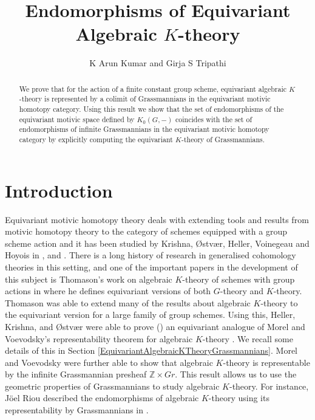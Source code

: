 \documentclass[11pt,twoside]{amsart}
\title{Endomorphisms of Equivariant Algebraic $K$-theory}
\author{K Arun Kumar and Girja S Tripathi}
\theoremstyle{definition}
\theoremstyle{remark}
\numberwithin{equation}{section}
\newcommand{\ZZ}{\mathbb{Z}}
\begin{document}


\begin{abstract} 
We prove that for the action of a finite constant group scheme, equivariant algebraic $K$-theory is represented by a colimit of Grassmannians in the equivariant motivic homotopy category. Using this result we show that the set of endomorphisms of the equivariant motivic space defined by $K_0(G,-)$ coincides with the set of endomorphisms of infinite Grassmannians in the equivariant motivic homotopy category by explicitly computing the equivariant $K$-theory of Grassmannians.
\end{abstract}
\maketitle

\section{Introduction}
 
Equivariant motivic homotopy theory deals with extending tools and results from motivic homotopy theory to the category of schemes equipped with a group scheme action and it has been studied by Krishna, \O stv\ae r, Heller, Voinegeau and Hoyois in \cite{HKO14}, \cite{HVO} and \cite{H20}. There is a long history of research in  generalised cohomology theories in this setting, and one of the important papers in the development of this subject is Thomason's work on algebraic $K$-theory of schemes with group actions in \cite{T87} where he defines equivariant versions of both $G$-theory and $K$-theory. Thomason was able to extend many of the results about algebraic $K$-theory to the equivariant version for a large family of group schemes. Using this, Heller, Krishna, and \O stv\ae r were able to prove (\cite[Corollary~5.2]{HKO14}) an equivariant analogue of Morel and Voevodsky's representability theorem for algebraic $K$-theory \cite[Proposition~4.3.9]{MV99}. We recall some details of this in Section \ref{EquivariantAlgebraicKTheoryGrassmannians}. Morel and Voevodsky were further able to show that algebraic $K$-theory is representable by the infinite Grassmannian presheaf $\ZZ\times Gr$\cite[Theorem ~4.3.13]{MV99}. This result allows us to use the geometric properties of Grassmannians to study algebraic $K$-theory. For instance, J\"oel Riou described the endomorphisms of algebraic $K$-theory using its representability by Grassmannians in \cite{R10}.
\end{document}
